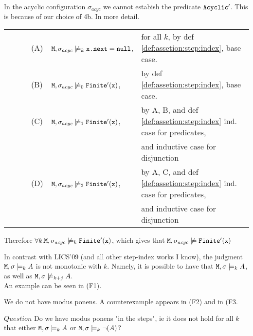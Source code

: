 \documentclass[acmsmall,screen]{acmart}
\begin{document}
\begin{example}

In the acyclic configuration $\sigma_{acyc}$ we cannot estabish the predicate ${\mbox{\tt{Acyclic}}}'$. This is because of our choice of 4b. In more detail.

\begin{tabular}{llll}
\ \ \ \ & (A) & ${\mbox{\tt{M}}},\sigma_{acyc}  \not \models_k   {\mbox{\tt{x.next}}}={\mbox{\tt{null}}} $,& for all $k$,   by def \ref{def:assetion:step:index}, base case.\\
\ \ \ \ & (B) & ${\mbox{\tt{M}}},\sigma_{acyc}  \not\models_0   {\mbox{\tt{Finite}}}'({\mbox{\tt{x}}})$,& by def \ref{def:assetion:step:index}, base case.\\
\ \ \ \ & (C) & ${\mbox{\tt{M}}},\sigma_{acyc}   \not\models_1   {\mbox{\tt{Finite}}}'({\mbox{\tt{x}}})$,& by A, B, and def \ref{def:assetion:step:index} ind.  case for predicates,\\
\ & & & and inductive case for disjunction\\
\ \ \ \ & (D) & ${\mbox{\tt{M}}},\sigma_{acyc}   \not\models_2   {\mbox{\tt{Finite}}}'({\mbox{\tt{x}}})$,& by A, C, and def \ref{def:assetion:step:index} ind.  case for predicates,\\
\ & & & and inductive case for disjunction\\

\end{tabular}

Therefore $\forall k. {\mbox{\tt{M}}},\sigma_{acyc}   \not\models_k   {\mbox{\tt{Finite}}}'({\mbox{\tt{x}}})$, which gives that ${\mbox{\tt{M}}},\sigma_{acyc}   \not\models    {\mbox{\tt{Finite}}}'({\mbox{\tt{x}}})$

\end{example}

\begin{observation}

 In contrast with LICS'09 (and all other step-index works I know), the judgment ${\mbox{\tt{M}}}, \sigma \models_k  A$ is not monotonic with $k$. Namely, it is possible to have that ${\mbox{\tt{M}}}, \sigma \models_k  A$, as well as
${\mbox{\tt{M}}}, \sigma \not\models_{k+j}  A$.
\\
An example can be seen in (F1).

\end{observation}

\begin{observation}

We do not have modus ponens. A counterexample appears in (F2) and in (F3.

$Question$ Do we have modus ponens "in the steps", ie it does not hold for all $k$ that either
${\mbox{\tt{M}}}, \sigma \models_k  A$ or ${\mbox{\tt{M}}}, \sigma \models_k  \neg(A)$?


\end{observation}
\end{document}
